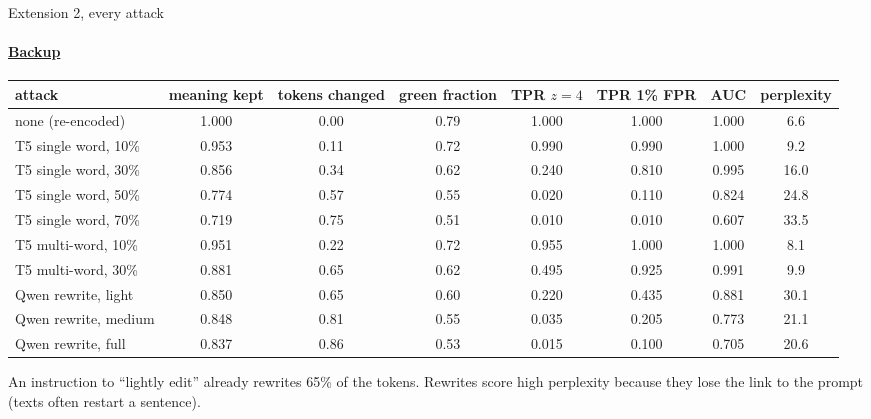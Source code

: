 \documentclass[aspectratio=169,10pt,t]{beamer}
\begin{document}
\begin{frame}[label=b17]{Extension 2, every attack}
  \framesubtitle{\hyperlink{b0}{Backup}}
  \scriptsize
  \begin{center}
  \begin{tabular}{@{}lccccccc@{}}
    \toprule
    attack & meaning kept & tokens changed & green fraction & TPR $z = 4$ & TPR 1\% FPR & AUC & perplexity \\
    \midrule
    none (re-encoded) & 1.000 & 0.00 & 0.79 & 1.000 & 1.000 & 1.000 & 6.6 \\
    \midrule
    T5 single word, 10\% & 0.953 & 0.11 & 0.72 & 0.990 & 0.990 & 1.000 & 9.2 \\
    T5 single word, 30\% & 0.856 & 0.34 & 0.62 & 0.240 & 0.810 & 0.995 & 16.0 \\
    T5 single word, 50\% & 0.774 & 0.57 & 0.55 & 0.020 & 0.110 & 0.824 & 24.8 \\
    T5 single word, 70\% & 0.719 & 0.75 & 0.51 & 0.010 & 0.010 & 0.607 & 33.5 \\
    \midrule
    T5 multi-word, 10\% & 0.951 & 0.22 & 0.72 & 0.955 & 1.000 & 1.000 & 8.1 \\
    T5 multi-word, 30\% & 0.881 & 0.65 & 0.62 & 0.495 & 0.925 & 0.991 & 9.9 \\
    \midrule
    Qwen rewrite, light & 0.850 & 0.65 & 0.60 & 0.220 & 0.435 & 0.881 & 30.1 \\
    Qwen rewrite, medium & 0.848 & 0.81 & 0.55 & 0.035 & 0.205 & 0.773 & 21.1 \\
    Qwen rewrite, full & 0.837 & 0.86 & 0.53 & 0.015 & 0.100 & 0.705 & 20.6 \\
    \bottomrule
  \end{tabular}
  \end{center}
  \vspace{0.3em}
  \small
  An instruction to ``lightly edit'' already rewrites 65\% of the tokens. Rewrites score high perplexity because they lose the link to the prompt (texts often restart a sentence).
\end{frame}
\end{document}
